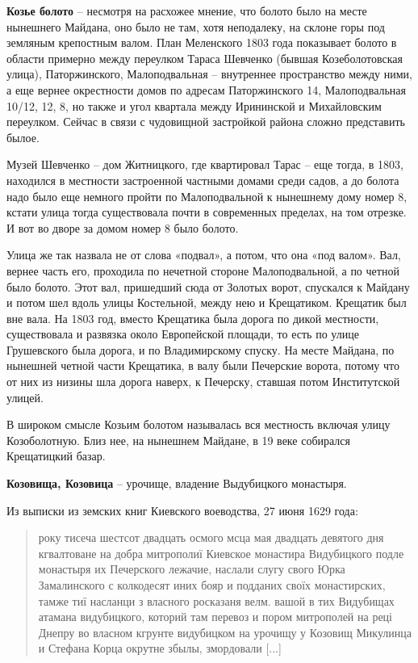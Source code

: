 \medskip


\textbf{Козье болото} – несмотря на расхожее мнение, что болото было на месте нынешнего Майдана, оно было не там, хотя неподалеку, на склоне горы под земляным крепостным валом. План Меленского 1803 года показывает болото в области примерно между переулком Тараса Шевченко (бывшая Козеболотовская улица), Паторжинского, Малоподвальная – внутреннее пространство между ними, а еще вернее окрестности домов по адресам Паторжинского 14, Малоподвальная 10/12, 12, 8, но также и угол квартала между Ирининской и Михайловским переулком. Сейчас в связи с чудовищной застройкой района сложно представить былое.

Музей Шевченко – дом Житницкого, где квартировал Тарас – еще тогда, в 1803, находился в местности застроенной частными домами среди садов, а до болота надо было еще немного пройти по Малоподвальной к нынешнему дому номер 8, кстати улица тогда существовала почти в современных пределах, на том отрезке. И вот во дворе за домом номер 8 было болото.

Улица же так назвала не от слова «подвал», а потом, что она «под валом». Вал, вернее часть его, проходила по нечетной стороне Малоподвальной, а по четной было болото. Этот вал, пришедший сюда от Золотых ворот, спускался к Майдану и потом шел вдоль улицы Костельной, между нею и Крещатиком. Крещатик был вне вала. На 1803 год, вместо Крещатика была дорога по дикой местности, существовала и развязка около Европейской площади, то есть по улице Грушевского была дорога, и по Владимирскому спуску. На месте Майдана, по нынешней четной части Крещатика, в валу были Печерские ворота, потому что от них из низины шла дорога наверх, к Печерску, ставшая потом Институтской улицей.

В широком смысле Козьим болотом называлась вся местность включая улицу Козоболотную. Близ нее, на нынешнем Майдане, в 19 веке собирался Крещатицкий базар.\\

\medskip



\textbf{Козовища, Козовица} – урочище, владение Выдубицкого монастыря.

Из выписки из земских книг Киевского воеводства, 27 июня 1629 года:

\begin{quotation}
року тисеча шестсот двадцать осмого мсца мая двадцать девятого дня кгвалтоване на добра митрополиї Киевское монастира Видубицкого подле монастыря их Печерского лежачие, наслали слугу свого Юрка Замалинского с колкодесят иних бояр и подданих своїх монастирских, тамже тиї насланци з власного росказаня велм. вашой в тих Видубищах атамана видубицкого, которий там перевоз и пором митрополей на реці Днепру во власном кгрунте видубицком на урочищу у Козовищ Микулинца и Стефана Корца окрутне збылы, змордовали [...] 
\end{quotation}


